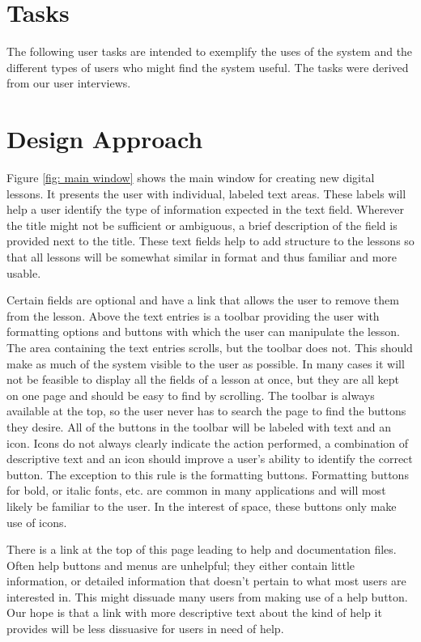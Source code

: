 \documentclass[10pt,letter,titlepage]{article}
\begin{document}
\section{Tasks}
The following user tasks are intended to exemplify the uses of the system and
the different types of users who might find the system useful. The tasks were
derived from our user interviews.



\section{Design Approach}
Figure \ref{fig: main window} shows the main window for creating new digital
lessons. It presents the user with individual, labeled text areas. These labels
will help a user identify the type of information expected in the text field.
Wherever the title might not be sufficient or ambiguous, a brief description of
the field is provided next to the title. These text fields help to add
structure to the lessons so that all lessons will be somewhat similar in format
and thus familiar and more usable.

Certain fields are optional and have a link that allows the user to remove them
from the lesson. Above the text entries is a toolbar providing the user with
formatting options and buttons with which the user can manipulate the lesson.
The area containing the text entries scrolls, but the toolbar does not. This
should make as much of the system visible to the user as possible. In many cases
it will not be feasible to display all the fields of a lesson at once, but they
are all kept on one page and should be easy to find by scrolling. The toolbar is
always available at the top, so the user never has to search the page to find
the buttons they desire. All of the buttons in the toolbar will be labeled with
text and an icon. Icons do not always clearly indicate the action performed, a
combination of descriptive text and an icon should improve a user's ability to
identify the correct button. The exception to this rule is the formatting
buttons. Formatting buttons for bold, or italic fonts, etc. are common in many
applications and will most likely be familiar to the user. In the interest of
space, these buttons only make use of icons.

There is a link at the top of this page leading to help and documentation files.
Often help buttons and menus are unhelpful; they either contain little
information, or detailed information that doesn't pertain to what most users are
interested in. This might dissuade many users from making use of a help button.
Our hope is that a link with more descriptive text about the kind of help it
provides will be less dissuasive for users in need of help.
\end{document}
